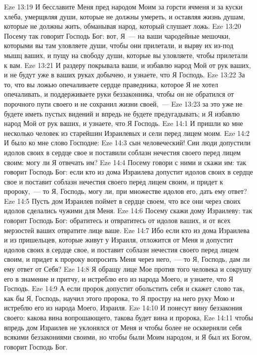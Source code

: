 \vs Eze 13:19 И бесславите Меня пред народом Моим за горсти ячменя и за куски хлеба, умерщвляя души, которые не должны умереть, и оставляя жизнь душам, которые не должны жить, обманывая народ, который слушает ложь.
\vs Eze 13:20 Посему так говорит Господь Бог: вот, Я~--- на ваши чародейные мешочки, которыми вы там уловляете души, чтобы они прилетали, и вырву их из-под мышц ваших, и пущу на свободу души, которые вы уловляете, чтобы прилетали к вам.
\vs Eze 13:21 И раздеру покрывала ваши, и избавлю народ Мой от рук ваших, и не будут уже в ваших руках добычею, и узнаете, что Я Господь.
\vs Eze 13:22 За то, что вы ложью опечаливаете сердце праведника, которое Я не хотел опечаливать, и поддерживаете руки беззаконника, чтобы он не обратился от порочного пути своего и не сохранил жизни своей,~---
\vs Eze 13:23 за это уже не будете иметь пустых видений и впредь не будете предугадывать; и Я избавлю народ Мой от рук ваших, и узнаете, что Я Господь.
\vs Eze 14:1 И пришли ко мне несколько человек из старейшин Израилевых и сели перед лицем моим.
\vs Eze 14:2 И было ко мне слово Господне:
\vs Eze 14:3 сын человеческий! Сии люди допустили идолов своих в сердце свое и поставили соблазн нечестия своего перед лицем своим: могу ли Я отвечать им?
\vs Eze 14:4 Посему говори с ними и скажи им: так говорит Господь Бог: если кто из дома Израилева допустит идолов своих в сердце свое и поставит соблазн нечестия своего перед лицем своим, и придет к пророку,~--- то Я, Господь, могу ли, при множестве идолов его, дать ему ответ?
\vs Eze 14:5 Пусть дом Израилев поймет в сердце своем, что все они через своих идолов сделались чужими для Меня.
\vs Eze 14:6 Посему скажи дому Израилеву: так говорит Господь Бог: обратитесь и отвратитесь от идолов ваших, и от всех мерзостей ваших отвратите лице ваше.
\vs Eze 14:7 Ибо если кто из дома Израилева и из пришельцев, которые живут у Израиля, отложится от Меня и допустит идолов своих в сердце свое, и поставит соблазн нечестия своего перед лицем своим, и придет к пророку вопросить Меня через него,~--- то Я, Господь, дам ли ему ответ от Себя?
\vs Eze 14:8 Я обращу лице Мое против того человека и сокрушу его в знамение и притчу, и истреблю его из народа Моего, и узнаете, что Я Господь.
\vs Eze 14:9 А если пророк допустит обольстить себя и скажет слово так, как бы Я, Господь, научил этого пророка, то Я простру на него руку Мою и истреблю его из народа Моего, Израиля.
\vs Eze 14:10 И понесут вину беззакония своего: какова вина вопрошающего, такова будет вина и пророка,
\vs Eze 14:11 чтобы впредь дом Израилев не уклонялся от Меня и чтобы более не оскверняли себя всякими беззакониями своими, но чтобы были Моим народом, и Я был их Богом, говорит Господь Бог.
